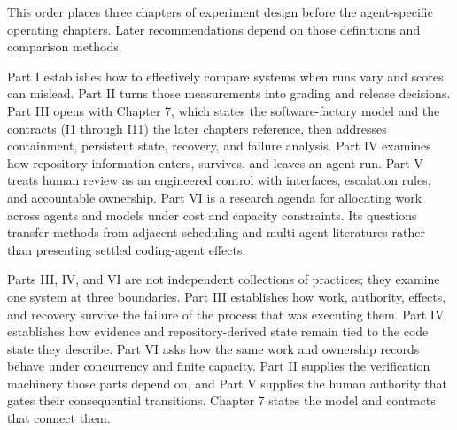 This order places three chapters of experiment design before the agent-specific operating chapters. Later recommendations depend on those definitions and comparison methods.

Part I establishes how to effectively compare systems when runs vary and scores can mislead. Part II turns those measurements into grading and release decisions. Part III opens with Chapter 7, which states the software-factory model and the contracts (I1 through I11) the later chapters reference, then addresses containment, persistent state, recovery, and failure analysis. Part IV examines how repository information enters, survives, and leaves an agent run. Part V treats human review as an engineered control with interfaces, escalation rules, and accountable ownership. Part VI is a research agenda for allocating work across agents and models under cost and capacity constraints. Its questions transfer methods from adjacent scheduling and multi-agent literatures rather than presenting settled coding-agent effects.

Parts III, IV, and VI are not independent collections of practices; they examine one system at three boundaries. Part III establishes how work, authority, effects, and recovery survive the failure of the process that was executing them. Part IV establishes how evidence and repository-derived state remain tied to the code state they describe. Part VI asks how the same work and ownership records behave under concurrency and finite capacity. Part II supplies the verification machinery those parts depend on, and Part V supplies the human authority that gates their consequential transitions. Chapter 7 states the model and contracts that connect them.


